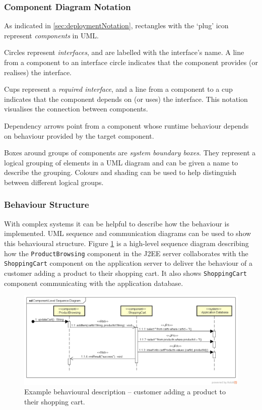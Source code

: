 \subsubsection{Component Diagram Notation}\label{sec:componentNotation}
As indicated in \ref{sec:deploymentNotation}, rectangles with the `plug' icon represent \emph{components} in UML.

Circles represent \emph{interfaces}, and are labelled with the interface's name.
A line from a component to an interface circle indicates that the component provides (or realises) the interface.

Cups represent a \emph{required interface}, and a line from a component to a cup indicates that the component depends on (or uses) the interface.
This notation visualises the connection between components.

Dependency arrows point from a component whose runtime behaviour depends on behaviour provided by the target component.

Boxes around groups of components are \emph{system boundary boxes}.
They represent a logical grouping of elements in a UML diagram and can be given a name to describe the grouping.
Colours and shading can be used to help distinguish between different logical groups.

\subsubsection{Behaviour Structure}\label{sec:behaviourStruct}
With complex systems it can be helpful to describe how the behaviour is implemented.
UML sequence and communication diagrams can be used to show this behavioural structure.
Figure \ref{fig:sequenceDiagram} is a high-level sequence diagram describing how the
\texttt{ProductBrowsing} component in the J2EE server collaborates with the
\texttt{ShoppingCart} component on the application server to deliver the behaviour of a customer adding a product to their shopping cart.
It also shows \texttt{ShoppingCart} component communicating with the application database.

\begin{figure}[h!]
    \centering
    \includegraphics[trim=28 70 23 44,clip,width=\textwidth]{images/uml/component-level_sequence_diagram.png}
    \caption{Example behavioural description -- customer adding a product to their shopping cart.}
    \label{fig:sequenceDiagram}
\end{figure}

